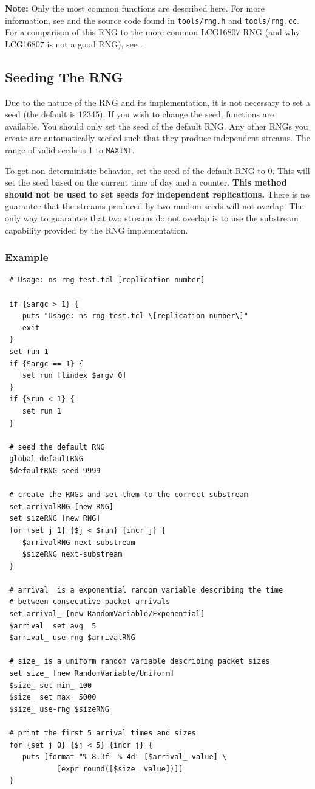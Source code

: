 {\bf Note:} Only the most common functions are described here. For
more information, see \cite{lecuyer01} and the source code found
in {\tt tools/rng.h} and {\tt tools/rng.cc}.  For a comparison of this RNG to
the more common LCG16807 RNG (and why LCG16807 is not a good RNG), 
see \cite{lecuyer-wsc}.
\subsection{Seeding The RNG}
Due to the nature of the RNG and its implementation, it is not
necessary to set a seed (the default is 12345).  If you wish to
change the seed, functions are available. You should only set the
seed of the default RNG.  Any other RNGs you create are
automatically seeded such that they produce independent streams.
The range of valid seeds is 1 to {\tt MAXINT}.

To get non-deterministic behavior, set the seed of the default RNG
to 0.  This will set the seed based on the current time of day and
a counter.  {\bf This method should not be used to set seeds for
independent replications.}  There is no guarantee that the streams
produced by two random seeds will not overlap.  The only way to
guarantee that two streams do not overlap is to use the substream
capability provided by the RNG implementation.

\subsubsection{Example}
\begin{verbatim}
 # Usage: ns rng-test.tcl [replication number]

 if {$argc > 1} {
    puts "Usage: ns rng-test.tcl \[replication number\]"
    exit
 }
 set run 1
 if {$argc == 1} {
    set run [lindex $argv 0]
 }
 if {$run < 1} {
    set run 1
 }

 # seed the default RNG
 global defaultRNG
 $defaultRNG seed 9999

 # create the RNGs and set them to the correct substream
 set arrivalRNG [new RNG]
 set sizeRNG [new RNG]
 for {set j 1} {$j < $run} {incr j} {
    $arrivalRNG next-substream
    $sizeRNG next-substream
 }

 # arrival_ is a exponential random variable describing the time
 # between consecutive packet arrivals
 set arrival_ [new RandomVariable/Exponential]
 $arrival_ set avg_ 5
 $arrival_ use-rng $arrivalRNG

 # size_ is a uniform random variable describing packet sizes
 set size_ [new RandomVariable/Uniform]
 $size_ set min_ 100
 $size_ set max_ 5000
 $size_ use-rng $sizeRNG

 # print the first 5 arrival times and sizes
 for {set j 0} {$j < 5} {incr j} {
    puts [format "%-8.3f  %-4d" [$arrival_ value] \
            [expr round([$size_ value])]]
 }
\end{verbatim}

